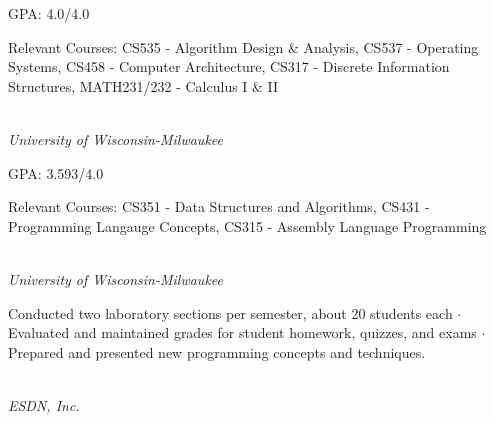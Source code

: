 \documentclass[11pt]{article}
\newcommand{\marginhead}[1]{\marginpar{\textsf{{\footnotesize\vspace{-1.35em}\flushright \hfill #1}}}}
\newcommand{\smaller}{\fontsize{9}{11}\selectfont}
\begin{document}
\begin{description}
	\setlength{\itemsep}{2pt}\small\begin{spacing}{1.2}
	
	\item[\smaller GPA:] {\small 4.0/4.0}
	\item[\smaller Relevant Courses:] {\small CS535 - Algorithm Design \& Analysis, CS537 - Operating Systems, CS458 - Computer Architecture, CS317 - Discrete Information Structures, MATH231/232 - Calculus I \& II}
	
	\end{spacing}
\end{description}


 \\ {\it University of Wisconsin-Milwaukee}

\begin{description}
	\setlength{\itemsep}{2pt}\small\begin{spacing}{1.2}
	
	\item[\smaller GPA:] {\small 3.593/4.0}
	\item[\smaller Relevant Courses:] {\small CS351 - Data Structures and Algorithms, CS431 - Programming Langauge Concepts, CS315 - Assembly Language Programming}
	
	\end{spacing}
\end{description}

\bigskip


\marginhead{Career History}


 \\ {\it University of Wisconsin-Milwaukee}

\noindent        Conducted two laboratory sections per semester, about 20 students each
{\large $\cdot$} Evaluated and maintained grades for student homework, quizzes, and exams
{\large $\cdot$} Prepared and presented new programming concepts and techniques.

\bigskip


 \\ {\it ESDN, Inc.}
\end{document}
